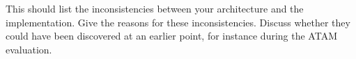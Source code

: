 
This should list the inconsistencies between your architecture and the implementation.
Give the reasons for these inconsistencies. Discuss whether they could have been discovered at an earlier point, for instance during the ATAM evaluation.
